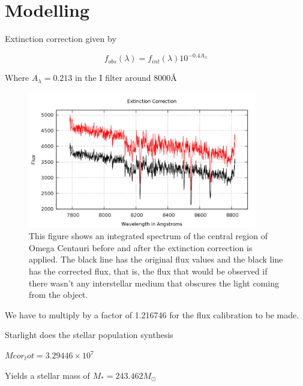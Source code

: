 \chapter{Modelling}

Extinction correction given by

\begin{equation}
f_{obs}(\lambda)=f_{int}(\lambda)10^{-0.4A_{\lambda}}
\end{equation}

Where $A_{\lambda}=0.213$ in the I filter around $8000 \textrm{\AA}$

\begin{figure}[H]
\centering
\includegraphics[width=10cm]{images/extinction.png}
\caption[Extinction Correction]{This figure shows an integrated spectrum of the central region of Omega Centauri before and after the extinction correction is applied. The black line has the original flux values and the black line has the corrected flux, that is, the flux that would be observed if there wasn't any interstellar medium that obscures the light coming from the object.}
\end{figure}

We have to multiply by a factor of 1.216746 for the flux calibration to be made.

Starlight does the stellar population synthesis 

$Mcor_tot = 3.29446 \times 10^{7}$

Yields a stellar mass of $M_{*}=243.462M_{\odot}$
